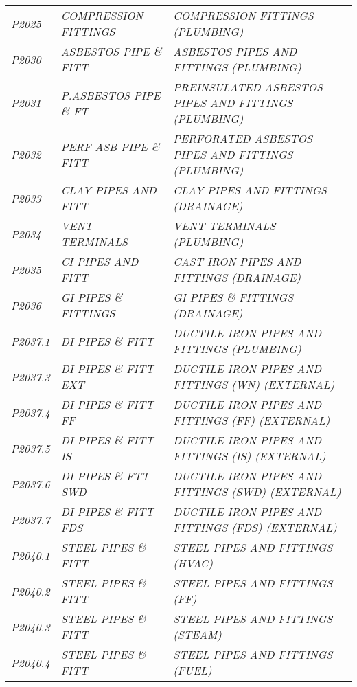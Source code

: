 \begin{landscape}
\begin{longtable}[l]{l%
                  l|%
                  l|}
\itshape P2025       &\itshape COMPRESSION FITTINGS   &\itshape COMPRESSION FITTINGS (PLUMBING)   \\
\itshape P2030       &\itshape ASBESTOS PIPE \& FITT   &\itshape ASBESTOS PIPES AND FITTINGS (PLUMBING)   \\
\itshape P2031       &\itshape P.ASBESTOS PIPE \& FT   &\itshape PREINSULATED ASBESTOS PIPES AND FITTINGS (PLUMBING)   \\
\itshape P2032       &\itshape PERF ASB PIPE \& FITT   &\itshape PERFORATED ASBESTOS PIPES AND FITTINGS (PLUMBING)   \\
\itshape P2033       &\itshape CLAY PIPES AND FITT   &\itshape CLAY PIPES AND FITTINGS (DRAINAGE)   \\
\itshape P2034       &\itshape VENT TERMINALS   &\itshape VENT TERMINALS (PLUMBING)   \\
\itshape P2035       &\itshape CI PIPES AND FITT   &\itshape CAST IRON PIPES AND FITTINGS (DRAINAGE)   \\
\itshape P2036       &\itshape GI PIPES \& FITTINGS   &\itshape GI PIPES \& FITTINGS (DRAINAGE)   \\
\itshape P2037.1     &\itshape DI PIPES \& FITT   &\itshape DUCTILE IRON PIPES AND FITTINGS (PLUMBING)   \\
\itshape P2037.3     &\itshape DI PIPES \& FITT EXT   &\itshape DUCTILE IRON PIPES AND FITTINGS (WN) (EXTERNAL)   \\
\itshape P2037.4     &\itshape DI PIPES \& FITT FF   &\itshape DUCTILE IRON PIPES AND FITTINGS (FF) (EXTERNAL)   \\
\itshape P2037.5     &\itshape DI PIPES \& FITT IS   &\itshape DUCTILE IRON PIPES AND FITTINGS (IS) (EXTERNAL)   \\
\itshape P2037.6     &\itshape DI PIPES \& FTT SWD   &\itshape DUCTILE IRON PIPES AND FITTINGS (SWD) (EXTERNAL)   \\
\itshape P2037.7     &\itshape DI PIPES \& FITT FDS   &\itshape DUCTILE IRON PIPES AND FITTINGS (FDS) (EXTERNAL)   \\
\itshape P2040.1     &\itshape STEEL PIPES \& FITT   &\itshape STEEL PIPES AND FITTINGS (HVAC)   \\
\itshape P2040.2     &\itshape STEEL PIPES \& FITT   &\itshape STEEL PIPES AND FITTINGS (FF)   \\
\itshape P2040.3     &\itshape STEEL PIPES \& FITT   &\itshape STEEL PIPES AND FITTINGS  (STEAM)   \\
\itshape P2040.4     &\itshape STEEL PIPES \& FITT   &\itshape STEEL PIPES AND FITTINGS (FUEL)   \\

\end{longtable}
\end{landscape}
